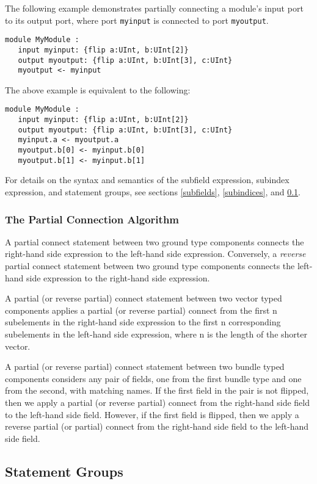 \documentclass[12pt]{article}
\begin{document}
The following example demonstrates partially connecting a module's input port to its output port, where port \verb|myinput| is connected to port \verb|myoutput|.
\begin{lstlisting}
module MyModule :
   input myinput: {flip a:UInt, b:UInt[2]}
   output myoutput: {flip a:UInt, b:UInt[3], c:UInt}
   myoutput <- myinput
\end{lstlisting}

The above example is equivalent to the following:
\begin{lstlisting}
module MyModule :
   input myinput: {flip a:UInt, b:UInt[2]}
   output myoutput: {flip a:UInt, b:UInt[3], c:UInt}
   myinput.a <- myoutput.a
   myoutput.b[0] <- myinput.b[0]
   myoutput.b[1] <- myinput.b[1]
\end{lstlisting}
For details on the syntax and semantics of the subfield expression, subindex expression, and statement groups, see sections \ref{subfields}, \ref{subindices}, and \ref{statement_groups}.

\subsubsection{The Partial Connection Algorithm} \label{partial_connection_algorithm}

A partial connect statement between two ground type components connects the right-hand side expression to the left-hand side expression. Conversely, a {\em reverse} partial connect statement between two ground type components connects the left-hand side expression to the right-hand side expression. 

A partial (or reverse partial) connect statement between two vector typed components applies a partial (or reverse partial) connect from the first n subelements in the right-hand side expression to the first n corresponding subelements in the left-hand side expression, where n is the length of the shorter vector. 

A partial (or reverse partial) connect statement between two bundle typed components considers any pair of fields, one from the first bundle type and one from the second, with matching names. If the first field in the pair is not flipped, then we apply a partial (or reverse partial) connect from the right-hand side field to the left-hand side field. However, if the first field is flipped, then we apply a reverse partial (or partial) connect from the right-hand side field to the left-hand side field. 

\subsection{Statement Groups} \label{statement_groups}
\end{document}
